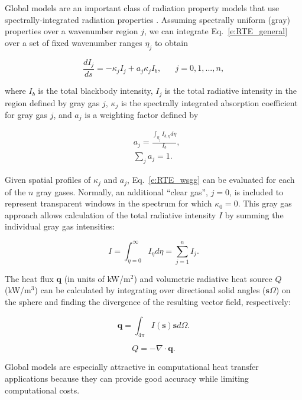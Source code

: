 \documentclass[preprint,12pt]{elsarticle}
\newcounter{bla}
\begin{document}
Global models are an important class of radiation property models that use spectrally-integrated radiation properties \cite{Hottel_1967,Modest_2013,Modest_2016}.
Assuming spectrally uniform (gray) properties over a wavenumber region $j$, we can integrate Eq.~\ref{e:RTE_general} over a set of fixed wavenumber ranges $\eta_j$ to obtain
%
\begin{linenomath}
\begin{equation} \label{e:RTE_wsgg}
    \frac{dI_j}{ds} = -\kappa_jI_j + a_j\kappa_jI_b, \hspace{20pt} j=0,1,...,n,
\end{equation}
\end{linenomath}
%
where $I_b$ is the total blackbody intensity, $I_j$ is the total radiative intensity in the region defined by gray gas $j$, $\kappa_j$ is the spectrally integrated absorption coefficient for gray gas $j$, and $a_j$ is a weighting factor defined by
%
\begin{linenomath}
\begin{align}
    &a_j= \frac{\int_{\eta_j}I_{b,\eta}d\eta}{I_b},\\
    &\sum_j a_j = 1.
\end{align}
\end{linenomath}
%
Given spatial profiles of $\kappa_j$ and $a_j$, Eq.~\ref{e:RTE_wsgg} can be evaluated for each of the $n$ gray gases. Normally, an additional ``clear gas'', $j=0$, is included to represent transparent windows in the spectrum for which $\kappa_0=0$.
This gray gas approach allows calculation of the total radiative intensity $I$ by summing the individual gray gas intensities:
%
\begin{linenomath}
\begin{equation}
I=\int_{\eta=0}^{\infty}I_{\eta}d\eta=\sum_{j=1}^n I_j.
\end{equation}
\end{linenomath}
%

The heat flux $\mathbf{q}$ (in units of kW/m$^2$) and volumetric radiative heat source $Q$ (kW/m$^3$) can be calculated by integrating over directional solid angles ($\mathbf{s}\Omega$) on the sphere and finding the divergence of the resulting vector field, respectively:
%
\begin{linenomath}
\begin{equation}
    \mathbf{q} = \int_{4\pi}I(\mathbf{s})\mathbf{s}d\Omega.
\end{equation}
\end{linenomath}
%
\begin{linenomath}
\begin{equation}
    Q = -\nabla\cdot\mathbf{q}.
\end{equation}
\end{linenomath}
%
Global models are especially attractive in computational heat transfer applications because they can provide good accuracy while limiting computational costs.
\end{document}
